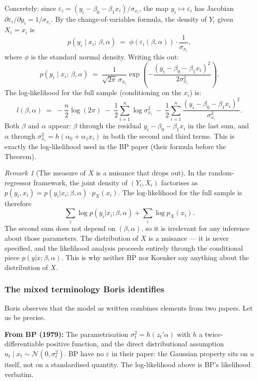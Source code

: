 \documentclass[a4paper,oneside,12pt]{extarticle}
\theoremstyle{plain}
\theoremstyle{definition}
\theoremstyle{remark}
\newtheorem{remark}[proposition]{Remark}
\begin{document}
Concretely: since $\varepsilon_i = (y_i - \beta_0 - \beta_1 x_i)/
\sigma_{x_i}$, the map $y_i \mapsto \varepsilon_i$ has Jacobian
$\partial\varepsilon_i/\partial y_i = 1/\sigma_{x_i}$.
By the change-of-variables formula, the density of $Y_i$ given
$X_i = x_i$ is
\[
  p(y_i \mid x_i;\,\beta,\alpha)
  \;=\;
  \phi\!\left(\varepsilon_i(\beta,\alpha)\right)
  \cdot
  \frac{1}{\sigma_{x_i}},
\]
where $\phi$ is the standard normal density.  Writing this out:
\[
  p(y_i \mid x_i;\,\beta,\alpha)
  \;=\;
  \frac{1}{\sqrt{2\pi}\,\sigma_{x_i}}
  \exp\!\left(-\frac{(y_i - \beta_0 - \beta_1 x_i)^2}{2\sigma_{x_i}^2}\right).
\]
The log-likelihood for the full sample (conditioning on the $x_i$) is:
\[
  \boxed{
  l(\beta,\alpha)
  \;=\;
  -\frac{n}{2}\log(2\pi)
  \;-\; \frac{1}{2}\sum_{i=1}^n \log\sigma_{x_i}^2
  \;-\; \frac{1}{2}\sum_{i=1}^n
  \frac{(y_i - \beta_0 - \beta_1 x_i)^2}{\sigma_{x_i}^2}.
  }
\]
Both $\beta$ and $\alpha$ appear: $\beta$ through the residual
$y_i - \beta_0 - \beta_1 x_i$ in the last sum, and $\alpha$ through
$\sigma_{x_i}^2 = h(\alpha_0 + \alpha_1 x_i)$ in both the second
and third terms.  This is exactly the log-likelihood used in the
BP paper (their formula before the Theorem).

\begin{remark}[The measure of $X$ is a nuisance that drops out]
In the random-regressor framework, the joint density of $(Y_i, X_i)$
factorises as $p(y_i, x_i) = p(y_i|x_i;\beta,\alpha)\cdot p_X(x_i)$.
The log-likelihood for the full sample is therefore
\[
  \sum_i \log p(y_i|x_i;\beta,\alpha) + \sum_i \log p_X(x_i).
\]
The second sum does not depend on $(\beta,\alpha)$, so it is
irrelevant for any inference about those parameters.  The distribution
of $X$ is a nuisance — it is never specified, and the likelihood
analysis proceeds entirely through the conditional piece $p(y|x;\beta,
\alpha)$.  This is why neither BP nor Koenker say anything about the
distribution of $X$.
\end{remark}

\subsubsection*{The mixed terminology Boris identifies}

Boris observes that the model as written combines elements from two
papers.  Let us be precise.

\textbf{From BP (1979):} The parametrisation $\sigma_t^2 = h(z_t'\alpha)$
with $h$ a twice-differentiable positive function, and the direct
distributional assumption $u_t \mid x_t \sim \mathcal{N}(0,\sigma_t^2)$.
BP have no $\varepsilon$ in their paper: the Gaussian property sits on
$u$ itself, not on a standardised quantity.
The log-likelihood above is BP's likelihood verbatim.
\end{document}
